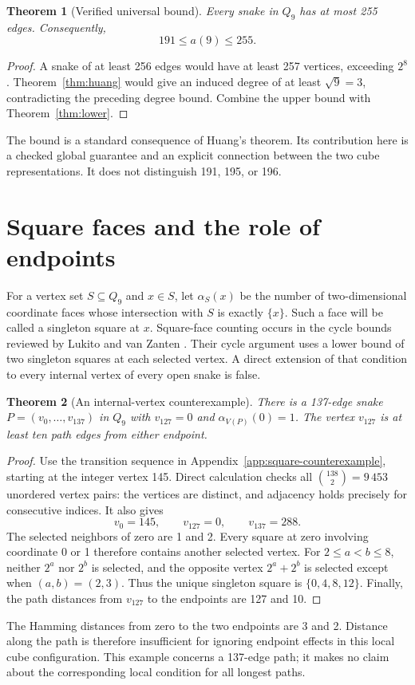 \documentclass[11pt,a4paper]{article}
\newtheorem{theorem}{Theorem}[section]
\theoremstyle{definition}
\theoremstyle{remark}
\newcommand{\Q}{Q}
\begin{document}
\begin{theorem}[Verified universal bound]\label{thm:upper}
Every snake in $\Q_9$ has at most 255 edges. Consequently,
\[
\boxed{191\le a(9)\le255.}
\]
\end{theorem}
\begin{proof}
A snake of at least 256 edges would have at least 257 vertices, exceeding $2^8$. Theorem~\ref{thm:huang} would give an induced degree of at least $\sqrt9=3$, contradicting the preceding degree bound. Combine the upper bound with Theorem~\ref{thm:lower}.
\end{proof}
The bound is a standard consequence of Huang's theorem. Its contribution here is a checked global guarantee and an explicit connection between the two cube representations. It does not distinguish 191, 195, or 196.


\section{Square faces and the role of endpoints}
For a vertex set $S\subseteq\Q_9$ and $x\in S$, let $\alpha_S(x)$ be the number of two-dimensional coordinate faces whose intersection with $S$ is exactly $\{x\}$. Such a face will be called a singleton square at $x$. Square-face counting occurs in the cycle bounds reviewed by Lukito and van Zanten \cite{lukito}. Their cycle argument uses a lower bound of two singleton squares at each selected vertex. A direct extension of that condition to every internal vertex of every open snake is false.

\begin{theorem}[An internal-vertex counterexample]\label{thm:square-counterexample}
There is a 137-edge snake $P=(v_0,\ldots,v_{137})$ in $\Q_9$ with $v_{127}=0$ and $\alpha_{V(P)}(0)=1$. The vertex $v_{127}$ is at least ten path edges from either endpoint.
\end{theorem}
\begin{proof}
Use the transition sequence in Appendix~\ref{app:square-counterexample}, starting at the integer vertex 145. Direct calculation checks all $\binom{138}{2}=9\,453$ unordered vertex pairs: the vertices are distinct, and adjacency holds precisely for consecutive indices. It also gives
\[
v_0=145,\qquad v_{127}=0,\qquad v_{137}=288.
\]
The selected neighbors of zero are 1 and 2. Every square at zero involving coordinate 0 or 1 therefore contains another selected vertex. For $2\le a<b\le8$, neither $2^a$ nor $2^b$ is selected, and the opposite vertex $2^a+2^b$ is selected except when $(a,b)=(2,3)$. Thus the unique singleton square is $\{0,4,8,12\}$. Finally, the path distances from $v_{127}$ to the endpoints are 127 and 10.
\end{proof}
The Hamming distances from zero to the two endpoints are 3 and 2. Distance along the path is therefore insufficient for ignoring endpoint effects in this local cube configuration. This example concerns a 137-edge path; it makes no claim about the corresponding local condition for all longest paths.
\end{document}
